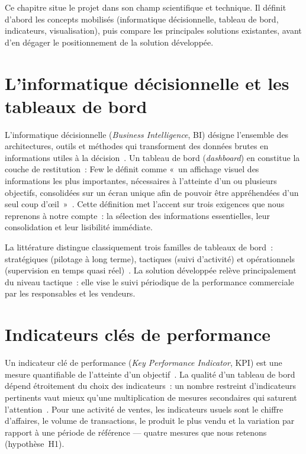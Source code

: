 \documentclass[11pt,a4paper]{report}
\begin{document}
Ce chapitre situe le projet dans son champ scientifique et technique. Il définit
d'abord les concepts mobilisés (informatique décisionnelle, tableau de bord,
indicateurs, visualisation), puis compare les principales solutions existantes,
avant d'en dégager le positionnement de la solution développée.

\section{L'informatique décisionnelle et les tableaux de bord}
L'informatique décisionnelle (\emph{Business Intelligence}, BI) désigne
l'ensemble des architectures, outils et méthodes qui transforment des données
brutes en informations utiles à la décision~\cite{chen2012bi}. Un tableau de
bord (\emph{dashboard}) en constitue la couche de restitution~: Few le définit
comme «~un affichage visuel des informations les plus importantes, nécessaires
à l'atteinte d'un ou plusieurs objectifs, consolidées sur un écran unique afin
de pouvoir être appréhendées d'un seul coup d'\oe{}il~»~\cite{few2006dashboard}.
Cette définition met l'accent sur trois exigences que nous reprenons à notre
compte~: la sélection des informations essentielles, leur consolidation et leur
lisibilité immédiate.

La littérature distingue classiquement trois familles de tableaux de bord~:
stratégiques (pilotage à long terme), tactiques (suivi d'activité) et
opérationnels (supervision en temps quasi réel)~\cite{eckerson2010performance}.
La solution développée relève principalement du niveau tactique~: elle vise le
suivi périodique de la performance commerciale par les responsables et les
vendeurs.

\section{Indicateurs clés de performance}
Un indicateur clé de performance (\emph{Key Performance Indicator}, KPI) est une
mesure quantifiable de l'atteinte d'un objectif~\cite{parmenter2015kpi}. La
qualité d'un tableau de bord dépend étroitement du choix des indicateurs~: un
nombre restreint d'indicateurs pertinents vaut mieux qu'une multiplication de
mesures secondaires qui saturent l'attention~\cite{few2006dashboard}. Pour une
activité de ventes, les indicateurs usuels sont le chiffre d'affaires, le volume
de transactions, le produit le plus vendu et la variation par rapport à une
période de référence — quatre mesures que nous retenons (hypothèse~H1).
\end{document}
